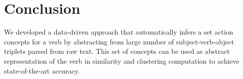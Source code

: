 \section{Conclusion}
\label{sec:conclude}
We developed a data-driven approach that automatically
infers a set action concepts for a verb by abstracting from large 
number of subject-verb-object triplets parsed from raw text.
This set of concepts can be used as abstract representation of
the verb in similarity and clustering computation to achieve
state-of-the-art accuracy.

%
%

